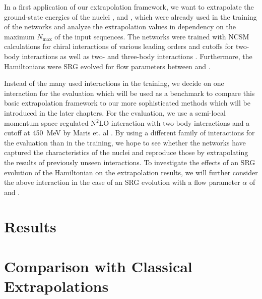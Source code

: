 In a first application of our extrapolation framework, we want to extrapolate the ground-state energies of the nuclei ,  and , which were already used in the training of the networks and analyze the extrapolation values in dependency on the maximum $N_\mathrm{max}$ of the input sequences. The networks were trained with NCSM calculations for chiral interactions of various leading orders and cutoffs for two-body interactions \cite{entemmachleidt} as well as two- and three-body interactions \cite{HUTHER2020135651}. Furthermore, the Hamiltonians were SRG evolved for flow parameters between  and .

Instead of the many used interactions in the training, we decide on one interaction for the evaluation which will be used as a benchmark to compare this basic extrapolation framework to our more sophisticated methods which will be introduced in the later chapters. For the evaluation, we use a semi-local momentum space regulated N$^2$LO interaction with two-body interactions and a cutoff at \SI{450}{\mega\electronvolt} by Maris et. al \cite{smsquelle}. By using a different family of interactions for the evaluation than in the training, we hope to see whether the networks have captured the characteristics of the nuclei and reproduce those by extrapolating the results of previously unseen interactions. To investigate the effects of an SRG evolution of the Hamiltonian on the extrapolation results, we will further consider the above interaction in the case of an SRG evolution with a flow parameter $\alpha$ of  and .

\section{Results}

\section{Comparison with Classical Extrapolations}

